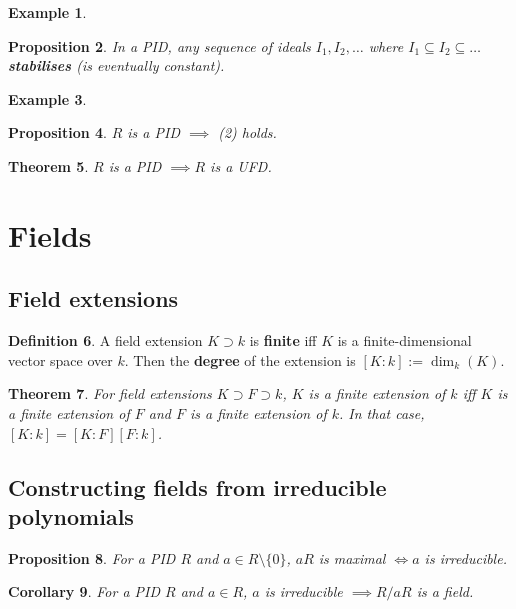 \documentclass[12pt]{article}
\newtheorem{thm}{Theorem}[section]
\newtheorem{cor}[thm]{Corollary}
\newtheorem{prop}[thm]{Proposition}
\theoremstyle{definition}
\newtheorem{defn}[thm]{Definition}
\newtheorem{exm}[thm]{Example}
\begin{document}
\begin{exm}
\end{exm}

\begin{prop}
  In a PID, any sequence of ideals $I_1, I_2, \ldots$ where $I_1 \subseteq I_2 \subseteq \ldots$ \textbf{stabilises} (is eventually constant).
\end{prop}

\begin{exm}
\end{exm}

\begin{prop}
  $R$ is a PID $\implies$ (2) holds.
\end{prop}

\begin{thm}
  $R$ is a PID $\implies R$ is a UFD.
\end{thm}

\section{Fields}

\subsection{Field extensions}

\begin{defn}
  A field extension $K \supset k$ is \textbf{finite} iff $K$ is a finite-dimensional vector space over $k$.
  Then the \textbf{degree} of the extension is $[K : k] := \dim_k(K)$.
\end{defn}

\begin{thm}
  For field extensions $K \supset F \supset k$, $K$ is a finite extension of $k$ iff $K$ is a finite extension of $F$ and $F$ is a finite extension of $k$.
  In that case, $[K : k] = [K : F][F : k]$.
\end{thm}

\subsection{Constructing fields from irreducible polynomials}

\begin{prop}
  For a PID $R$ and $a \in R \setminus \{0\}$, $aR$ is maximal $\iff a$ is irreducible.
\end{prop}

\begin{cor}
  For a PID $R$ and $a \in R$, $a$ is irreducible $\implies R / aR$ is a field.
\end{cor}
\end{document}
